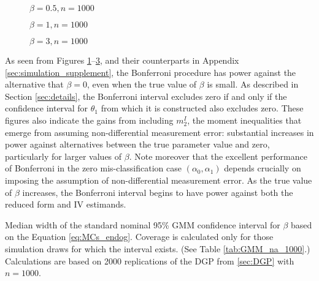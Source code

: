 \begin{figure}[h]
  \centering
  \caption{$\beta = 0.5, n = 1000$}
  \label{fig:bonf_point5_1000}
\end{figure}

\begin{figure}[h]
  \centering
  \caption{$\beta = 1, n = 1000$}
  \label{fig:bonf_1_1000}
\end{figure}

\begin{figure}[h]
  \centering
  \caption{$\beta = 3, n = 1000$}
  \label{fig:bonf_3_1000}
\end{figure}

As seen from Figures \ref{fig:bonf_point5_1000}--\ref{fig:bonf_3_1000}, and their counterparts in Appendix \ref{sec:simulation_supplement}, the Bonferroni procedure has power against the alternative that $\beta = 0$, even when the true value of $\beta$ is small.
As described in Section \ref{sec:details}, the Bonferroni interval excludes zero if and only if the confidence interval for $\theta_1$ from which it is constructed also excludes zero.
These figures also indicate the gains from including $m_2^I$, the moment inequalities that emerge from assuming non-differential measurement error: substantial increases in power against alternatives between the true parameter value and zero, particularly for larger values of $\beta$.
Note moreover that the excellent performance of Bonferroni in the zero mis-classification case $(\alpha_0, \alpha_1)$ depends crucially on imposing the assumption of non-differential measurement error.
As the true value of $\beta$ increases, the Bonferroni interval begins to have power against both the reduced form and IV estimands.

\begin{table}[htbp]
  \small
  \centering
  
  \caption{Median width of the standard nominal 95\% GMM confidence interval for $\beta$ based on the Equation \ref{eq:MCs_endog}. Coverage is calculated only for those simulation draws for which the interval exists. (See Table \ref{tab:GMM_na_1000}.) Calculations are based on 2000 replications of the DGP from \ref{sec:DGP} with $n = 1000$.} 
  \label{tab:GMM_width_1000}
\end{table}

